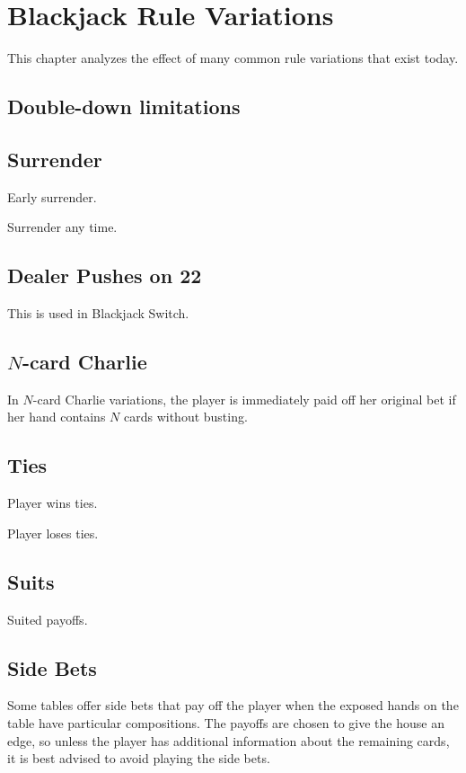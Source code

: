 
\chapter{Blackjack Rule Variations}
\label{sec:var}

This chapter analyzes the effect of many common rule variations
that exist today.

\section{Double-down limitations}
\label{sec:var:double}

\section{Surrender}
\label{sec:var:surrender}

Early surrender.

Surrender any time.

\section{Dealer Pushes on 22}
\label{sec:var:push22}

This is used in Blackjack Switch.

\section{$N$-card Charlie}
\label{sec:var:charlie}

In $N$-card Charlie variations, 
the player is immediately paid off her original bet 
if her hand contains $N$ cards without busting.  

\section{Ties}
\label{sec:var:ties}

Player wins ties.

Player loses ties.

\section{Suits}
\label{sec:var:suits}

Suited payoffs.  

\section{Side Bets}
\label{sec:var:sidebets}

Some tables offer side bets that pay off the player
when the exposed hands on the table have particular compositions.
The payoffs are chosen to give the house an edge, 
so unless the player has additional information about
the remaining cards, 
it is best advised to avoid playing the side bets.  

